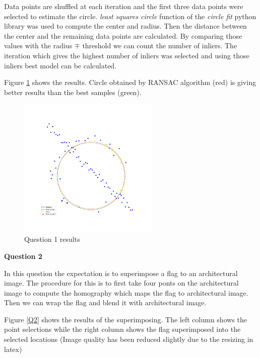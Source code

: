 \documentclass[11pt]{article}
\begin{document}
\noindent Data points are shuffled at each iteration and the first three data points were selected to estimate the circle. \textit{least squares circle} 
function of the \textit{circle fit} python library was used to compute the center and radius. Then the distance between the center and the remaining 
data points are calculated. By comparing those values with the radius $\mp$ threshold we can count the number of inliers. The iteration which gives the highest
number of inliers was selected and using those inliers best model can be calculated. 

\noindent Figure \ref{RANSAC} shows the results. Circle obtained by RANSAC algorithm (red) is giving better results than the best samples (green). \\

\begin{figure}[!h]
    \centering
    \includegraphics[width=0.6\textwidth]{Images/1.png}
    \caption{Question 1 results}
    \label{RANSAC}
\end{figure}

\newpage
\noindent \textbf{Question 2}

\noindent In this question the expectation is to superimpose a flag to an architectural image. The procedure for this is to first take four ponts
on the architectural image to compute the homography which maps the flag to architectural image. Then we can wrap the flag and blend it with architectural
image. 

\noindent Figure \ref{Q2} shows the results of the superimposing. The left column shows the point selections while the right column shows
the flag superimposed into the selected locations (Image quality has been reduced slightly due to the resizing in latex) \\
\end{document}
